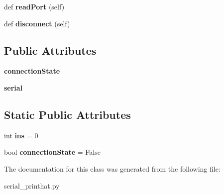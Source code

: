 \begin{DoxyCompactItemize}
\item 
def {\bfseries read\+Port} (self)\hypertarget{classserial__printhat_1_1_gcode_serial_ad891447bd77b7c72479275e963707aca}{}\label{classserial__printhat_1_1_gcode_serial_ad891447bd77b7c72479275e963707aca}

\item 
def {\bfseries disconnect} (self)\hypertarget{classserial__printhat_1_1_gcode_serial_a062d2321478b320d2e8fda8ec546d563}{}\label{classserial__printhat_1_1_gcode_serial_a062d2321478b320d2e8fda8ec546d563}

\end{DoxyCompactItemize}
\subsection*{Public Attributes}
\begin{DoxyCompactItemize}
\item 
{\bfseries connection\+State}\hypertarget{classserial__printhat_1_1_gcode_serial_a75cc30c7a97be0a19c799c9e3ebc8060}{}\label{classserial__printhat_1_1_gcode_serial_a75cc30c7a97be0a19c799c9e3ebc8060}

\item 
{\bfseries serial}\hypertarget{classserial__printhat_1_1_gcode_serial_a964d79ae702712d1c17196f8125843be}{}\label{classserial__printhat_1_1_gcode_serial_a964d79ae702712d1c17196f8125843be}

\end{DoxyCompactItemize}
\subsection*{Static Public Attributes}
\begin{DoxyCompactItemize}
\item 
int {\bfseries ins} = 0\hypertarget{classserial__printhat_1_1_gcode_serial_acfa7b28feeb6ce7c7f4d3c30bdc8e1b7}{}\label{classserial__printhat_1_1_gcode_serial_acfa7b28feeb6ce7c7f4d3c30bdc8e1b7}

\item 
bool {\bfseries connection\+State} = False\hypertarget{classserial__printhat_1_1_gcode_serial_a5307655ea0360555deb81d41e12e8039}{}\label{classserial__printhat_1_1_gcode_serial_a5307655ea0360555deb81d41e12e8039}

\end{DoxyCompactItemize}


The documentation for this class was generated from the following file\+:\begin{DoxyCompactItemize}
\item 
serial\+\_\+printhat.\+py\end{DoxyCompactItemize}
